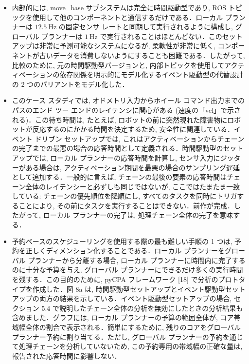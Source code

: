 \begin{frame}{}
    \begin{itemize}
        \item 内部的には, move\_base サブシステムは完全に時間駆動型であり, ROS トピックを使用して他のコンポーネントと通信するだけである．ローカル プランナーは $12.5 \mathrm{~Hz}$ の固定センサ レートと同期して実行されるように構成し, グローバル プランナーは $1 \mathrm{~Hz}$ で実行されることはほとんどない．このセットアップは非常に予測可能なシステムになるが, 柔軟性が非常に低く, コンポーネントが古いデータを消費しないようにすることも困難である．したがって, 比較のために, 元の時間駆動型バージョンと, 内部トピックを使用してアクティベーションの依存関係を明示的にモデル化するイベント駆動型の代替設計の 2 つのバリアントをモデル化した．
    \end{itemize}
\end{frame}

\begin{frame}{}
    \begin{itemize}
        \item このケース スタディでは, オドメトリ入力からホイール コマンド出力までのパスのエンド ツー エンドのレイテンシに関心がある (速度の「vel」で示される)．この待ち時間は, たとえば, ロボットの前に突然現れた障害物にロボットが反応するのにかかる時間を決定するため, 安全性に関連している．イベント ドリブン セットアップでは, これはアクティベーションからチェーンの完了までの最悪の場合の応答時間として定義される．時間駆動型のセットアップでは, ローカル プランナーの応答時間を計算し, センサ入力にジッターがある場合は, アクティベーション期間を最悪の場合のサンプリング遅延として追加する．一般的に言えば, チェーンの最後の要素の応答時間はチェーン全体のレイテンシーと必ずしも同じではないが, ここではたまたま一致している: チェーンの優先順位を降順にし, すべてのタスクを同時にトリガすることにより, その前にタスクを実行することはできない．前作が完成．したがって, ローカル プランナーの完了は, 処理チェーン全体の完了を意味する．
    \end{itemize}
\end{frame}

\begin{frame}{}
    \begin{itemize}
        \item 予約ベースのスケジューリングを使用する際の最も難しい手順の 1 つは, 予約を正しくディメンション化することである．ローカル プランナーをグローバル プランナーから分離する場合, ローカル プランナーに時間内に完了するのに十分な予算を与え, グローバル プランナーにできるだけ多くの実行時間を残する．この目的のために, pyCPA フレームワーク [18] で分析のプロトタイプを作成した．図 8a は, 時間駆動型セットアップとイベント駆動型セットアップの両方の結果を示している．イベント駆動型セットアップの場合, セクション 5.4 で説明したチェーン全体の分析を無効にしたときの分析結果も含めました．グラフには, ローカル プランナーの予算の範囲全体が, コア帯域幅全体の割合で表示される．簡単にするために, 残りのコアをグローバル プランナー予約に割り当てる．ただし, グローバル プランナーの予約を通じて処理チェーンを分析していないため, この予約専用の帯域幅の正確な量は, 報告された応答時間に影響しない．
    \end{itemize}
\end{frame}

